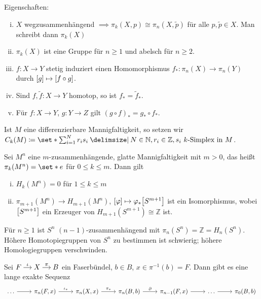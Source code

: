 Eigenschaften: 
\begin{enumerate}[(i)]
	\item $X$ wegzusammenhängend $\implies \pi_k(X,p) \cong \pi_n(X,\tilde{p})$ für alle $p, \tilde{p} \in X$. 
	Man schreibt dann $\pi_k(X)$
	\item $\pi_k(X)$ ist eine Gruppe für $n \ge 1$ und abelsch für $n \ge 2$.
	\item $f \colon X \to Y$ stetig induziert einen Homomorphismus $f_* \colon \pi_n(X) \to \pi_n(Y)$ durch $\benbrace*{g} \mapsto \benbrace*{f \circ g}$.
	\item Sind $f, \tilde{f} \colon X \to Y$ homotop, so ist $f_* = \tilde{f}_*$.
	\item Für $f \colon X \to Y$, $g \colon Y \to Z$ gilt $(g \circ f)_* = g_* \circ f_*$.
\end{enumerate}

Ist $M$ eine differenzierbare Mannigfaltigkeit, so setzen wir $C_k(M) \coloneqq \set*{\sum_{i=1}^N r_i s_i \given N \in \mathbb{N}, r_i \in \mathbb{Z}, s_i \text{ $k$-Simplex in }M  }$.

\begin{satz}[name={Hurewicz, siehe Hatcher}]
	Sei $M^n$ eine $m$-zusammenhängende, glatte Mannigfaltigkeit mit $m>0$, das heißt $\pi_k(M^n)= \set*{e}$ für $0 \le k \le m$.
	Dann gilt
	\begin{enumerate}[(i)]
		\item $H_k(M^n) =0$ für $1 \le k \le m$
		\item $\pi_{m+1}(M^n) \to H_{m+1}(M^n)$, $\benbrace*{\varphi} \mapsto \varphi_* \benbrace*{S^{m+1}}$ ist ein Isomorphismus, wobei $\benbrace*{S^{m+1}}$ ein Erzeuger von $H_{m+1}(S^{m+1}) \cong \mathbb{Z}$ ist.
	\end{enumerate}
\end{satz}

\begin{bemerkung*}
	Für $n \ge 1$ ist $S^n$ $(n-1)$-zusammenhängend mit $\pi_n(S^n) = \mathbb{Z} = H_n(S^n)$.
	Höhere Homotopiegruppen von $S^n$ zu bestimmen ist schwierig; höhere Homologiegruppen verschwinden.
\end{bemerkung*}

\begin{satz}[{name={Homotopiesequenz, Hatcher}}]
	Sei \(
		\begin{tikzcd}[cramped,sep=small]
			F \rar["\iota"] & X \rar["\pi"] & B
		\end{tikzcd}
	\)
	ein Faserbündel, $b \in B$, $x \in \pi^{-1}(b)=F$.
	Dann gibt es eine lange exakte Sequenz
	\[
		\begin{tikzcd}
			\ldots  \rar & \pi_n(F,x) \rar["\iota_*"] & \pi_n(X,x) \rar["\pi_*"] & \pi_n(B,b) \rar["\partial"] & \pi_{n-1}(F,x) \rar & \ldots \rar & \pi_0(B,b)
		\end{tikzcd}
	\]
\end{satz}

